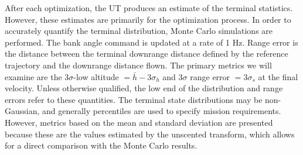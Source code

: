 \documentclass[journal ]{new-aiaa}
\begin{document}
After each optimization, the UT produces an estimate of the terminal statistics. However, these estimates are primarily for the optimization process. In order to accurately quantify the terminal distribution, Monte Carlo simulations are performed. The bank angle command is updated at a rate of 1 Hz. Range error is the distance between the terminal downrange distance defined by the reference trajectory and the downrange distance flown. The primary metrics we will examine are the 3$\sigma$-low altitude $=\bar{h}-3\sigma_h$ and 3$\sigma$ range error $= 3\sigma_s$ at the final velocity. Unless otherwise qualified, the low end of the distribution and range errors refer to these quantities. The terminal state distributions may be non-Gaussian, and generally percentiles are used to specify mission requirements. However, metrics based on the mean and standard deviation are presented because these are the values estimated by the unscented transform, which allows for a direct comparison with the Monte Carlo results.
\end{document}
